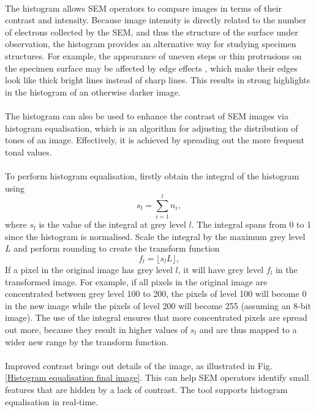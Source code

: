 \documentclass[12pt, twocolumn]{report}
\begin{document}
\paragraph{}
The histogram allows SEM operators to compare images in terms of their contrast and intensity. Because image intensity is directly related to the number of electrons collected by the SEM, and thus the structure of the surface under observation, the histogram provides an alternative way for studying specimen structures. For example, the appearance of uneven steps or thin protrusions on the specimen surface may be affected by edge effects \cite{SEM A to Z}, which make their edges look like thick bright lines instead of sharp lines. This results in strong highlights in the histogram of an otherwise darker image.

\paragraph{}
The histogram can also be used to enhance  the contrast of SEM images via histogram equalisation, which is an algorithm for adjusting the distribution of tones of an image. Effectively, it is achieved by spreading out the more frequent tonal values. 

\paragraph{}
To perform histogram equalisation, firstly obtain the integral of the histogram using
\[s_l = \sum_{i=1}^{l} n_i,\]
where $s_l$ is the value of the integral at grey level $l$. The integral spans from 0 to 1 since the histogram is normalised. Scale the integral by the maximum grey level $L$ and perform rounding to create the transform function
\begin{equation}
    f_l = \lfloor s_lL \rfloor,
    \label{Histogram equalisation transform function}
\end{equation}
If a pixel in the original image has grey level $l$, it will have grey level $f_l$ in the transformed image. For example, if all pixels in the original image are concentrated between grey level 100 to 200, the pixels of level 100 will become 0 in the new image while the pixels of level 200 will become 255 (assuming an 8-bit image). The use of the integral ensures that more concentrated pixels are spread out more, because they result in higher values of $s_l$ and are thus mapped to a wider new range by the transform function.

\paragraph{}
Improved contrast brings out details of the image, as illustrated in Fig. \ref{Histogram equalisation final image}. This can help SEM operators identify small features that are hidden by a lack of contrast. The tool supports histogram equalisation in real-time.
\end{document}

